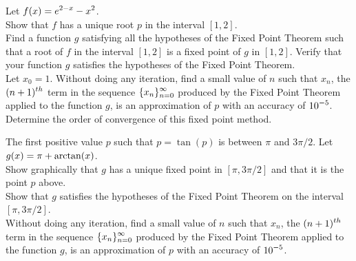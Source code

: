 \begin{question}
Let $\displaystyle f(x) = e^{2-x} -x^2$.\\
 Show that $f$ has a unique root $p$ in the interval $[1,2]$.\\
 Find a function $g$ satisfying all the hypotheses of the Fixed
Point Theorem such that a root of $f$ in the interval $[1,2]$ is a
fixed point of $g$ in $[1,2]$.  Verify that your function $g$ satisfies
the hypotheses of the Fixed Point Theorem.\\
 Let $x_0= 1$.  Without doing any iteration, find a small value
of $n$ such that $x_n$, the $\displaystyle (n+1)^{th}$ term in the sequence
$\displaystyle \{x_n\}_{n=0}^\infty$ produced by the Fixed Point
Theorem applied to the function $g$, is an approximation of $p$ with
an accuracy of $\displaystyle 10^{-5}$.\\
 Determine the order of convergence of this fixed point
method.
\end{question}


\begin{question}
The first positive value $p$ such that $p=\tan(p)$ is between $\pi$
and $3\pi/2$.  Let $\displaystyle g(x) = \pi + \arctan(x)$.\\
 Show graphically that $g$ has a unique fixed point in
$[\pi,3\pi/2]$ and that it is the point $p$ above.\\
 Show that $g$ satisfies the hypotheses of the Fixed Point
Theorem on the interval $[\pi,3\pi/2]$.\\
 Without doing any iteration, find a small value
of $n$ such that $x_n$, the $\displaystyle (n+1)^{th}$ term in the sequence
$\displaystyle \{x_n\}_{n=0}^\infty$ produced by the Fixed Point
Theorem applied to the function $g$, is an approximation of $p$ with
an accuracy of $\displaystyle 10^{-5}$.
\end{question}

